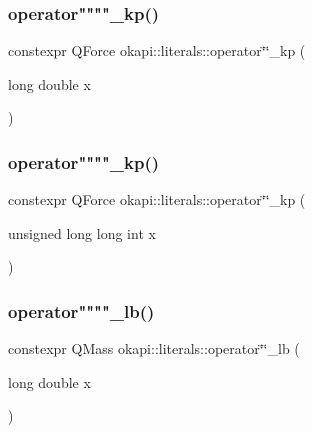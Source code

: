 \mbox{\label{namespaceokapi_1_1literals_ada1579c899ee7af6561e231b7f663c94}} 
\subsubsection{\texorpdfstring{operator""""\_kp()}{operator""\_kp()}\hspace{0.1cm}{\footnotesize\ttfamily [1/2]}}
{\footnotesize\ttfamily constexpr Q\+Force okapi\+::literals\+::operator\char`\"{}\char`\"{}\+\_\+kp (\begin{DoxyParamCaption}\item[{long double}]{x }\end{DoxyParamCaption})}

\mbox{\label{namespaceokapi_1_1literals_af0310e1ec8068c11f8aee0d5a2b94a38}} 
\subsubsection{\texorpdfstring{operator""""\_kp()}{operator""\_kp()}\hspace{0.1cm}{\footnotesize\ttfamily [2/2]}}
{\footnotesize\ttfamily constexpr Q\+Force okapi\+::literals\+::operator\char`\"{}\char`\"{}\+\_\+kp (\begin{DoxyParamCaption}\item[{unsigned long long int}]{x }\end{DoxyParamCaption})}

\mbox{\label{namespaceokapi_1_1literals_a78d921210c09125a5fce9245e0f35d02}} 
\subsubsection{\texorpdfstring{operator""""\_lb()}{operator""\_lb()}\hspace{0.1cm}{\footnotesize\ttfamily [1/2]}}
{\footnotesize\ttfamily constexpr Q\+Mass okapi\+::literals\+::operator\char`\"{}\char`\"{}\+\_\+lb (\begin{DoxyParamCaption}\item[{long double}]{x }\end{DoxyParamCaption})}

